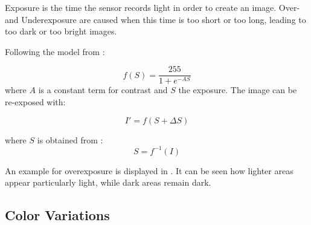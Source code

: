 Exposure is the time the sensor records light in order to create an image. Over- and Underexposure are caused when this time is too short or too long, leading to too dark or too bright images.

Following the model from \cite{Carlson2018}:
 
\begin{equation}
f(S) = \frac{255}{1 + e^{-A S}}
\end{equation}
where $A$ is a constant term for contrast and $S$ the exposure.
The image can be re-exposed with:

\begin{equation}
	I' = f(S+\Delta S)
\end{equation}

where $S$ is obtained from :
\begin{equation}
S = f^{-1}(I)
\end{equation}

An example for overexposure is displayed in . It can be seen how lighter areas appear particularly light, while dark areas remain dark.

\subsection{Color Variations}



